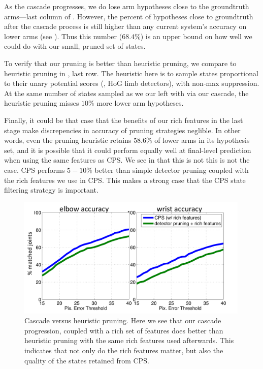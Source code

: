 As the cascade progresses, we do lose arm hypotheses close to the groundtruth 
arms---last column of .  However, the percent of hypotheses close 
to groundtruth after the cascade process is still higher than any current 
system's accuracy on lower arms (see ).  Thus this number 
($68.4 \%$) is an upper bound on how well we could do with our small, pruned 
set of states.

To verify that our pruning is better than heuristic pruning, we compare to 
heuristic pruning in , last row.  The heuristic here is to sample 
states proportional to their unary potential scores (\ie, HoG limb detectors), 
with non-max suppression.  At the same number of states sampled as we our left 
with via our cascade, the heuristic pruning misses $10\%$ more lower arm 
hypotheses.

Finally, it could be that case that the benefits of our rich features in the 
last stage make discrepencies in accuracy of pruning strategies neglible.  In 
other words, even the pruning heuristic retains $58.6\%$ of lower arms in its 
hypothesis set, and it is possible that it could perform equally well at 
final-level prediction when using the same features as CPS.  We see in 
 that this is not this is not the case.  CPS 
performs $5-10\%$ better than simple detector pruning coupled with the rich 
features we use in CPS.  This makes a strong case that the CPS state filtering 
strategy is important.

\begin{figure}[tb]
\begin{center}
\includegraphics[width=0.99\textwidth]{figs/cascade-vs-pruning.pdf}
\caption[Cascade versus heuristic pruning.]{Cascade versus heuristic pruning.  
Here we see that our cascade progression, coupled with a rich set of features 
does better than heuristic pruning with the same rich features used afterwards.  
This indicates that not only do the rich features matter, but also the quality 
of the states retained from CPS.}
\label{fig:cascade-vs-pruning}
\end{center}
\end{figure}


